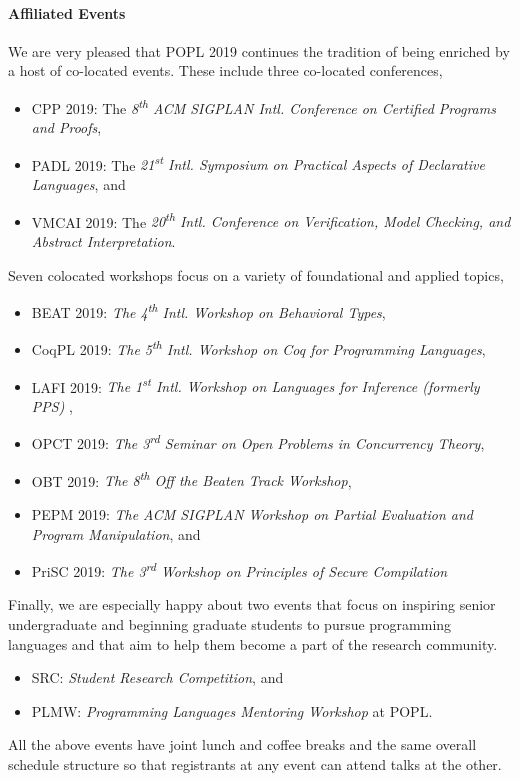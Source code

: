\paragraph{Affiliated Events}
%
We are very pleased that POPL 2019 continues the tradition of being enriched
by a host of co-located events.
%
These include three co-located conferences,
%
\begin{itemize}
  \item CPP 2019:   The \emph{8\textsuperscript{th} ACM SIGPLAN Intl. Conference on Certified Programs and Proofs},
  \item PADL 2019:  The \emph{21\textsuperscript{st} Intl. Symposium on Practical Aspects of Declarative Languages}, and
  \item VMCAI 2019: The \emph{20\textsuperscript{th} Intl. Conference on Verification, Model Checking, and Abstract Interpretation}.
\end{itemize}
%
Seven colocated workshops focus on a variety of foundational and applied topics,
%
\begin{itemize}
  \item BEAT 2019: \emph{The 4\textsuperscript{th} Intl. Workshop on Behavioral Types},
  \item CoqPL 2019: \emph{The 5\textsuperscript{th} Intl. Workshop on Coq for Programming Languages},
  \item LAFI 2019: \emph{The 1\textsuperscript{st} Intl. Workshop on Languages for Inference (formerly PPS) },
  \item OPCT 2019:   \emph{The 3\textsuperscript{rd} Seminar on Open Problems in Concurrency Theory},
  \item OBT 2019:   \emph{The 8\textsuperscript{th} Off the Beaten Track Workshop},
  \item PEPM 2019:  \emph{The ACM SIGPLAN Workshop on Partial Evaluation and Program Manipulation}, and
  \item PriSC 2019: \emph{The 3\textsuperscript{rd} Workshop on Principles of Secure Compilation}
\end{itemize}
%
Finally, we are especially happy about two events that
focus on inspiring senior undergraduate and beginning
graduate students to pursue programming languages and
that aim to help them become a part of the research
community.
%
\begin{itemize}
\item SRC: \emph{Student Research Competition}, and
\item PLMW: \emph{Programming Languages Mentoring Workshop} at POPL.
\end{itemize}
%
All the above events have joint lunch and coffee breaks
and the same overall schedule structure so that registrants
at any event can attend talks at the other.

